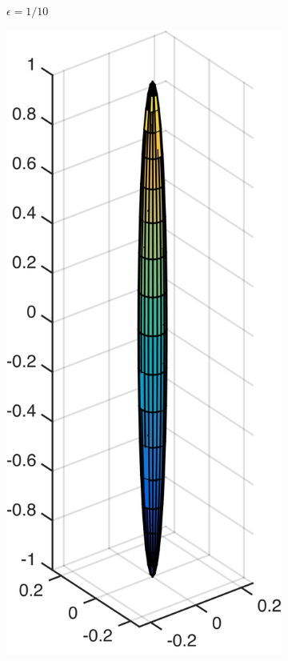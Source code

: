 \begin{figure}[!htbp]
\begin{subfigure}[h]{0.24\textwidth}
    \caption{$\epsilon=1/10$}\label{fig:slenderness_1_10}
  \end{subfigure}
  \begin{subfigure}[h]{0.24\textwidth}
    \centering
    \includegraphics[width=\textwidth]{img/slender/1_20.png}

\end{subfigure}
\end{figure}
